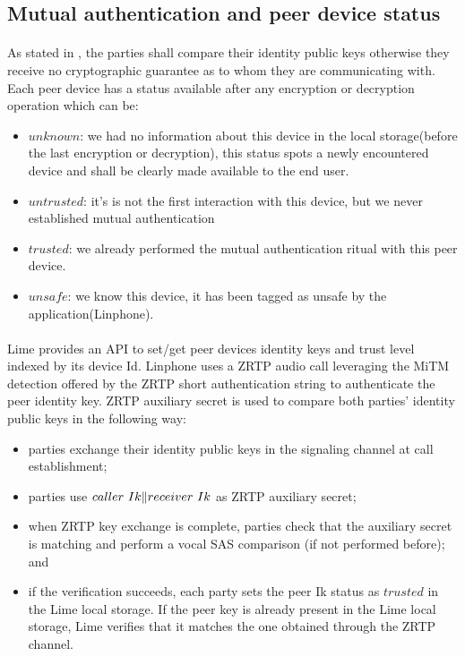 \documentclass[a4paper,11pt]{article}
\begin{document}
  \subsection{Mutual authentication and peer device status}
    \label{subsec:mutualauthentication}
    \paragraph{}As stated in \cite[section 4.1]{x3dh}, the parties shall compare their identity public keys otherwise they receive no cryptographic guarantee as to whom they are communicating with. Each peer device has a status available after any encryption or decryption operation which can be:
   \begin{itemize}
      \item $unknown$: we had no information about this device in the local storage(before the last encryption or decryption), this status spots a newly encountered device and shall be clearly made available to the end user.
      \item $untrusted$: it's is not the first interaction with this device, but we never established mutual authentication
      \item $trusted$: we already performed the mutual authentication ritual with this peer device.
      \item $unsafe$: we know this device, it has been tagged as unsafe by the application(Linphone).
   \end{itemize}
    \paragraph{}Lime provides an API to set/get peer devices identity keys and trust level indexed by its device Id. Linphone uses a ZRTP\cite{zrtp} audio call leveraging the MiTM detection offered by the ZRTP short authentication string to authenticate the peer identity key. ZRTP auxiliary secret is used to compare both parties' identity public keys in the following way:
    \begin{itemize}
      \item parties exchange their identity public keys in the signaling channel at call establishment;
      \item parties use $caller\ Ik \Arrowvert receiver\ Ik$ as ZRTP auxiliary secret;
      \item when ZRTP key exchange is complete, parties check that the auxiliary secret is matching and perform a vocal SAS comparison (if not performed before); and
      \item if the verification succeeds, each party sets the peer Ik status as $trusted$ in the Lime local storage. If the peer key is already present in the Lime local storage, Lime verifies that it matches the one obtained through the ZRTP channel.
    \end{itemize}
\end{document}
